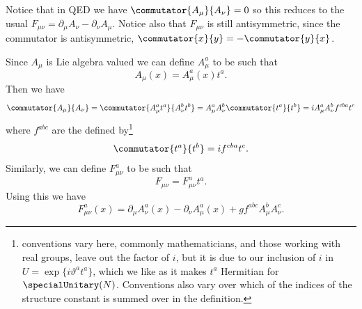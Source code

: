 \documentclass[fleqn]{NotesClass}
\begin{document}
    Notice that in QED we have \(\commutator{A_\mu}{A_\nu} = 0\) so this reduces to the usual \(F_{\mu\nu} = \partial_\mu A_\nu - \partial_\nu A_\mu\).
    Notice also that \(F_{\mu\nu}\) is still antisymmetric, since the commutator is antisymmetric, \(\commutator{x}{y} = -\commutator{y}{x}\).
    
    Since \(A_\mu\) is Lie algebra valued we can define \(A^a_\mu\) to be such that
    \begin{equation}
        A_\mu(x) = A^a_\mu(x)t^a.
    \end{equation}
    Then we have
    \begin{equation}
        \commutator{A_\mu}{A_\nu} = \commutator{A^a_\mu t^a}{A^b_\nu t^b} = A^a_\mu A^b_\nu \commutator{t^a}{t^b} = iA^a_\mu A^b_\nu f^{cba}t^c
    \end{equation}
    where \(f^{abc}\) are the  defined by\footnote{conventions vary here, commonly mathematicians, and those working with real groups, leave out the factor of \(i\), but it is due to our inclusion of \(i\) in \(U = \exp\{i\vartheta^at^a\}\), which we like as it makes \(t^a\) Hermitian for \(\specialUnitary(N)\). Conventions also vary over which of the indices of the structure constant is summed over in the definition.}
    \begin{equation}
        \commutator{t^a}{t^b} = if^{cba}t^c.
    \end{equation}
    Similarly, we can define \(F^a_{\mu\nu}\) to be such that
    \begin{equation}
        F_{\mu\nu} = F^a_{\mu\nu}t^a.
    \end{equation}
    Using this we have
    \begin{equation}
        F^a_{\mu\nu}(x) = \partial_\mu A^a_\nu(x) - \partial_\nu A^a_\mu(x) + gf^{abc}A^b_\mu A^c_\nu.
    \end{equation}
    
\end{document}
